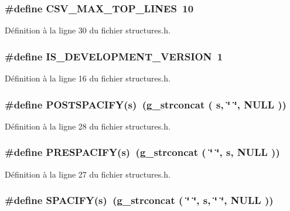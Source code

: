 \subsubsection[{CSV\_\-MAX\_\-TOP\_\-LINES}]{\setlength{\rightskip}{0pt plus 5cm}\#define CSV\_\-MAX\_\-TOP\_\-LINES~10}\label{structures_8h_a6579a0d80c7ece1e151b927eaf548f62}


Définition à la ligne 30 du fichier structures.h.

\subsubsection[{IS\_\-DEVELOPMENT\_\-VERSION}]{\setlength{\rightskip}{0pt plus 5cm}\#define IS\_\-DEVELOPMENT\_\-VERSION~1}\label{structures_8h_a180760e9c5236a1ac40cad78329ecb7e}


Définition à la ligne 16 du fichier structures.h.

\subsubsection[{POSTSPACIFY}]{\setlength{\rightskip}{0pt plus 5cm}\#define POSTSPACIFY(s)~(g\_\-strconcat ( s, \char`\"{} \char`\"{}, NULL ))}\label{structures_8h_acec4595b4886c3686815d8cd5fb79a0f}


Définition à la ligne 28 du fichier structures.h.

\subsubsection[{PRESPACIFY}]{\setlength{\rightskip}{0pt plus 5cm}\#define PRESPACIFY(s)~(g\_\-strconcat ( \char`\"{} \char`\"{}, s, NULL ))}\label{structures_8h_a4b7af7f6d6792977527776b10b9d70e0}


Définition à la ligne 27 du fichier structures.h.

\subsubsection[{SPACIFY}]{\setlength{\rightskip}{0pt plus 5cm}\#define SPACIFY(s)~(g\_\-strconcat ( \char`\"{} \char`\"{}, s, \char`\"{} \char`\"{}, NULL ))}\label{structures_8h_a865883e81d37f6f4329636d5170f5209}


